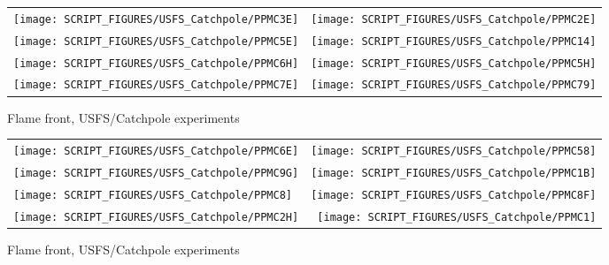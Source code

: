 \begin{figure}[p]
\begin{tabular*}{\textwidth}{l@{\extracolsep{\fill}}r}
\texttt{[image: SCRIPT\_FIGURES/USFS\_Catchpole/PPMC3E]} &
\texttt{[image: SCRIPT\_FIGURES/USFS\_Catchpole/PPMC2E]} \\
\texttt{[image: SCRIPT\_FIGURES/USFS\_Catchpole/PPMC5E]} &
\texttt{[image: SCRIPT\_FIGURES/USFS\_Catchpole/PPMC14]} \\
\texttt{[image: SCRIPT\_FIGURES/USFS\_Catchpole/PPMC6H]} &
\texttt{[image: SCRIPT\_FIGURES/USFS\_Catchpole/PPMC5H]} \\
\texttt{[image: SCRIPT\_FIGURES/USFS\_Catchpole/PPMC7E]} &
\texttt{[image: SCRIPT\_FIGURES/USFS\_Catchpole/PPMC79]} \\
\end{tabular*}
\caption[Flame front, USFS/Catchpole experiments]{Flame front, USFS/Catchpole experiments}
\label{USFS_Catchpole_232}
\end{figure}

\begin{figure}[p]
\begin{tabular*}{\textwidth}{l@{\extracolsep{\fill}}r}
\texttt{[image: SCRIPT\_FIGURES/USFS\_Catchpole/PPMC6E]} &
\texttt{[image: SCRIPT\_FIGURES/USFS\_Catchpole/PPMC58]} \\
\texttt{[image: SCRIPT\_FIGURES/USFS\_Catchpole/PPMC9G]} &
\texttt{[image: SCRIPT\_FIGURES/USFS\_Catchpole/PPMC1B]} \\
\texttt{[image: SCRIPT\_FIGURES/USFS\_Catchpole/PPMC8]} &
\texttt{[image: SCRIPT\_FIGURES/USFS\_Catchpole/PPMC8F]} \\
\texttt{[image: SCRIPT\_FIGURES/USFS\_Catchpole/PPMC2H]} &
\texttt{[image: SCRIPT\_FIGURES/USFS\_Catchpole/PPMC1]} \\
\end{tabular*}
\caption[Flame front, USFS/Catchpole experiments]{Flame front, USFS/Catchpole experiments}
\label{USFS_Catchpole_240}
\end{figure}

